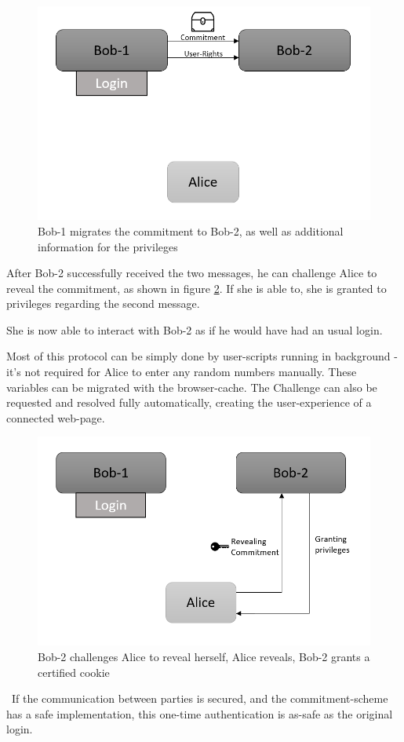 \begin{figure}[h]
	\centering
	\includegraphics[width=0.6\linewidth]{Images/UseCaseTwo}
	\caption[Protocol Start]{Bob-1 migrates the commitment to Bob-2, as well as additional information for the privileges}
	\label{fig:usecasetwo}
\end{figure}
After Bob-2 successfully received the two messages, he can challenge Alice to reveal the commitment, as shown in figure \ref{fig:usecasethree}. If she is able to, she is granted to privileges regarding the second message. 

She is now able to interact with Bob-2 as if he would have had an usual login.

Most of this protocol can be simply done by user-scripts running in background - it's not required for Alice to enter any random numbers manually. These variables can be migrated with the browser-cache. The Challenge can also be requested and resolved fully automatically, creating the user-experience of a connected web-page.  
\begin{figure}[h]
	\centering
	\includegraphics[width=0.6\linewidth]{Images/UseCaseThree}
	\caption[Protocol Start]{Bob-2 challenges Alice to reveal herself, Alice reveals, Bob-2 grants a certified cookie}
	\label{fig:usecasethree}
\end{figure}

~\newline If the communication between parties is secured, and the commitment-scheme has a safe implementation, this one-time authentication is as-safe as the original login. 